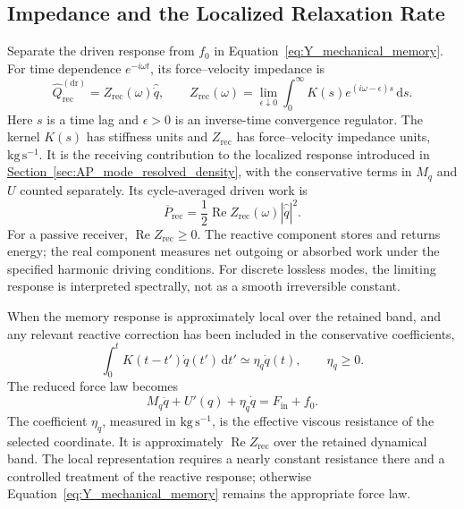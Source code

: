 \subsection{Impedance and the Localized Relaxation Rate}
\label{sec:Y_impedance_rate}

Separate the driven response from $f_0$ in Equation~\eqref{eq:Y_mechanical_memory}. For time dependence $e^{-i\omega t}$, its force--velocity impedance is
\begin{equation}
    \widehat Q_{\mathrm{rec}}^{(\mathrm{dr})}
    =Z_{\mathrm{rec}}(\omega)\widehat{\dot q},
    \qquad
    Z_{\mathrm{rec}}(\omega)
    =\lim_{\epsilon\downarrow0}\int_0^\infty
    K(s)e^{(i\omega-\epsilon)s}\,\mathrm ds.
    \label{eq:Y_receiving_impedance}
\end{equation}
Here $s$ is a time lag and $\epsilon>0$ is an inverse-time convergence regulator. The kernel $K(s)$ has stiffness units and $Z_{\mathrm{rec}}$ has force--velocity impedance units, $\mathrm{kg\,s^{-1}}$. It is the receiving contribution to the localized response introduced in \hyperref[sec:AP_mode_resolved_density]{Section~\ref*{sec:AP_mode_resolved_density}}, with the conservative terms in $M_q$ and $U$ counted separately. Its cycle-averaged driven work is
\begin{equation}
    \boxed{
    \overline P_{\mathrm{rec}}
    =\frac12\operatorname{Re}Z_{\mathrm{rec}}(\omega)
    \left|\widehat{\dot q}\right|^2
    }.
    \label{eq:Y_impedance_power}
\end{equation}
For a passive receiver, $\operatorname{Re}Z_{\mathrm{rec}}\geq0$. The reactive component stores and returns energy; the real component measures net outgoing or absorbed work under the specified harmonic driving conditions. For discrete lossless modes, the limiting response is interpreted spectrally, not as a smooth irreversible constant.

When the memory response is approximately local over the retained band, and any relevant reactive correction has been included in the conservative coefficients,
\begin{equation}
    \int_0^t K(t-t')\dot q(t')\,\mathrm dt'
    \simeq\eta_q\dot q(t),
    \qquad \eta_q\geq0.
\end{equation}
The reduced force law becomes
\begin{equation}
    M_q\ddot q+U'(q)+\eta_q\dot q
    =F_{\mathrm{in}}+f_0.
    \label{eq:Y_local_force_law}
\end{equation}
The coefficient $\eta_q$, measured in $\mathrm{kg\,s^{-1}}$, is the effective viscous resistance of the selected coordinate. It is approximately $\operatorname{Re}Z_{\mathrm{rec}}$ over the retained dynamical band. The local representation requires a nearly constant resistance there and a controlled treatment of the reactive response; otherwise Equation~\eqref{eq:Y_mechanical_memory} remains the appropriate force law.

